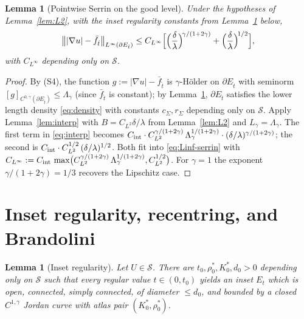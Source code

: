 \documentclass[11pt]{amsart}
\newtheorem{lemma}[theorem]{Lemma}
\newcommand{\Et}{E_{\hat t}}
\newcommand{\Sclass}{\mathcal S}
\begin{document}
\begin{lemma}[Pointwise Serrin on the good level]\label{lem:Linf}
Under the hypotheses of Lemma~\ref{lem:L2}, with the inset
regularity constants from Lemma~\ref{lem:inset-regularity} below,
\begin{equation}\label{eq:Linf-serrin}
   \bigl\||\nabla u|-\bar f_{\hat t}\bigr\|_{L^\infty(\partial \Et)}
      \le
   C_{L^\infty}\Bigl[
      \Bigl(\frac{\delta}{\lambda}\Bigr)^{\!\gamma/(1+2\gamma)}
      +\Bigl(\frac{\delta}{\lambda}\Bigr)^{\!1/2}
   \Bigr],
\end{equation}
with $C_{L^\infty}$ depending only on $\Sclass$.
\end{lemma}

\begin{proof}
By (S4), the function $g:=|\nabla u|-\bar f_{\hat t}$ is
$\gamma$-Hölder on $\partial\Et$ with seminorm
$[g]_{C^{0,\gamma}(\partial\Et)}\le\Lambda_\gamma$ (since
$\bar f_{\hat t}$ is constant); by
Lemma~\ref{lem:inset-regularity}, $\partial\Et$ satisfies the
lower length density \eqref{eq:density} with constants
$c_\Sigma,r_\Sigma$ depending only on $\Sclass$.  Apply
Lemma~\ref{lem:interp} with $B=C_{L^2}\delta/\lambda$ from
Lemma~\ref{lem:L2} and $L_\gamma=\Lambda_\gamma$.  The first term
in \eqref{eq:interp} becomes
$C_{\rm int}\cdot C_{L^2}^{\gamma/(1+2\gamma)}\,
\Lambda_\gamma^{1/(1+2\gamma)}\cdot
(\delta/\lambda)^{\gamma/(1+2\gamma)}$;
the second is $C_{\rm int}\cdot C_{L^2}^{1/2}\,(\delta/\lambda)^{1/2}$.
Both fit into \eqref{eq:Linf-serrin} with
$C_{L^\infty}:=C_{\rm int}\,\max\bigl(C_{L^2}^{\gamma/(1+2\gamma)}\,
\Lambda_\gamma^{1/(1+2\gamma)},C_{L^2}^{1/2}\bigr)$.  For
$\gamma=1$ the exponent $\gamma/(1+2\gamma)=1/3$ recovers the
Lipschitz case.
\end{proof}

\section{Inset regularity, recentring, and Brandolini}

\begin{lemma}[Inset regularity]\label{lem:inset-regularity}
Let $U\in\Sclass$.  There are $t_0,\rho_0^*,K_0^*,d_0>0$ depending
only on $\Sclass$ such that every regular value $t\in(0,t_0)$
yields an inset $E_t$ which is open, connected, simply connected,
of diameter $\le d_0$, and bounded by a closed $C^{1,\gamma}$ Jordan
curve with atlas pair $(K_0^*,\rho_0^*)$.
\end{lemma}
\end{document}
